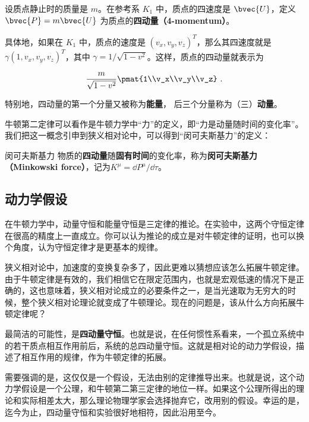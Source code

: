 设质点静止时的质量是 $m$。在参考系 $K_1$ 中，质点的四速度是 $\bvec{U}$，定义 $\bvec{P}=m\bvec{U}$ 为质点的\textbf{四动量（4-momentum）}。

具体地，如果在 $K_1$ 中，质点的速度是 $(v_x, v_y, v_z)^T$，那么其四速度就是 $\gamma(1, v_x, v_y, v_z)^T$，其中 $\gamma=1/\sqrt{1-v^2}$。这样，质点的四动量就表示为

\begin{equation}
\frac{m}{\sqrt{1-v^2}}\pmat{1\\v_x\\v_y\\v_z}~.
\end{equation}

特别地，四动量的第一个分量又被称为\textbf{能量}， 后三个分量称为（三）\textbf{动量}。

牛顿第二定律可以看作是牛顿力学中“力”的定义，即“力是动量随时间的变化率”。我们把这一概念引申到狭义相对论中，可以得到“闵可夫斯基力”的定义：

\begin{definition}{闵可夫斯基力}
物质的\textbf{四动量}随\textbf{固有时间}的变化率，称为\textbf{闵可夫斯基力（Minkowski force）}，记为$K^{\mu}=\dd P^\mu/\dd\tau$。
\end{definition}


\subsection{动力学假设}

在牛顿力学中，动量守恒和能量守恒是三定律的推论。在实验中，这两个守恒定律在很高的精度上一直成立。你可以认为推论的成立是对牛顿定律的证明，也可以换个角度，认为守恒定律才是更基本的规律。

狭义相对论中，加速度的变换复杂多了，因此更难以猜想应该怎么拓展牛顿定律。由于牛顿定律是有效的，我们相信它在限定范围内，也就是宏观低速的情况下是正确的，这也意味着，狭义相对论成立的必要条件之一，是当光速取为无穷大的时候，整个狭义相对论理论就变成了牛顿理论。现在的问题是，该从什么方向拓展牛顿定律呢？

最简洁的可能性，是\textbf{四动量守恒}。也就是说，在任何惯性系看来，一个孤立系统中的若干质点相互作用前后，系统的总四动量守恒。这就是相对论的动力学假设，描述了相互作用的规律，作为牛顿定律的拓展。

需要强调的是，这仅仅是一个假设，无法由别的定律推导出来。也就是说，这个动力学假设是一个公理，和牛顿第二第三定律的地位一样。如果这个公理所得出的理论和实际相差太大，那么理论物理学家会选择抛弃它，改用别的假设。幸运的是，迄今为止，四动量守恒和实验很好地相符，因此沿用至今。





